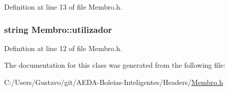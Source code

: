 Definition at line 13 of file Membro.\+h.

\hypertarget{class_membro_a42cc733ff94ec8d1bbfdacc62dfbb0e7}{
\subsubsection[{utilizador}]{\setlength{\rightskip}{0pt plus 5cm}string Membro\+::utilizador\hspace{0.3cm}{\ttfamily [protected]}}}\label{class_membro_a42cc733ff94ec8d1bbfdacc62dfbb0e7}


Definition at line 12 of file Membro.\+h.



The documentation for this class was generated from the following file\+:\begin{DoxyCompactItemize}
\item 
C\+:/\+Users/\+Gustavo/git/\+A\+E\+D\+A-\/\+Boleias-\/\+Inteligentes/\+Headers/\hyperlink{_membro_8h}{Membro.\+h}\end{DoxyCompactItemize}
